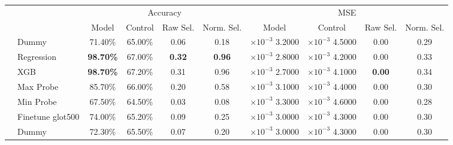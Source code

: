 \begin{tabular}{ll||cccccccc}
	                         &                  & \multicolumn{4}{c|}{Accuracy}                                                                            & \multicolumn{4}{c}{MSE}                                                                                \\
	                         &                  & Model                         & Control           & Raw Sel.       & \multicolumn{1}{c|}{Norm. Sel.}     & Model                             & Control                           & Raw Sel.       & Norm. Sel.    \\\hhline{*{10}{=}}
	\multirow{6}{*}{Arabic}  & Dummy            & 71.40\%                       & 65.00\%           & 0.06           & \multicolumn{1}{c|}{0.18}           & $\times 10^{-3}$ 3.2000           & $\times 10^{-3}$ 4.5000           & 0.00           & 0.29          \\
	                         & Regression       & \bfseries 98.70\%             & 67.00\%           & \bfseries 0.32 & \multicolumn{1}{c|}{\bfseries 0.96} & $\times 10^{-3}$ 2.8000           & $\times 10^{-3}$ 4.2000           & 0.00           & 0.33          \\
	                         & XGB              & \bfseries 98.70\%             & 67.20\%           & 0.31           & \multicolumn{1}{c|}{0.96}           & $\times 10^{-3}$ 2.7000           & $\times 10^{-3}$ 4.1000           & \bfseries 0.00 & 0.34          \\
	                         & Max Probe        & 85.70\%                       & 66.00\%           & 0.20           & \multicolumn{1}{c|}{0.58}           & $\times 10^{-3}$ 3.1000           & $\times 10^{-3}$ 4.4000           & 0.00           & 0.30          \\
	                         & Min Probe        & 67.50\%                       & 64.50\%           & 0.03           & \multicolumn{1}{c|}{0.08}           & $\times 10^{-3}$ 3.3000           & $\times 10^{-3}$ 4.6000           & 0.00           & 0.28          \\
	                         & Finetune glot500 & 74.00\%                       & 65.20\%           & 0.09           & \multicolumn{1}{c|}{0.25}           & $\times 10^{-3}$ 3.0000           & $\times 10^{-3}$ 4.3000           & 0.00           & 0.30          \\\hhline{*{10}{-}}
	\multirow{6}{*}{English} & Dummy            & 72.30\%                       & 65.50\%           & 0.07           & \multicolumn{1}{c|}{0.20}           & $\times 10^{-3}$ 3.0000           & $\times 10^{-3}$ 4.3000           & 0.00           & 0.30          \\

\end{tabular}
